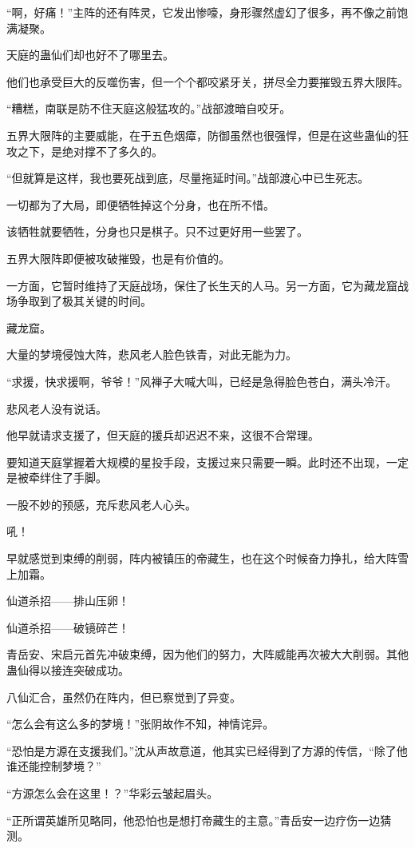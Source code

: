 \begin{this_body}
“啊，好痛！”主阵的还有阵灵，它发出惨嚎，身形骤然虚幻了很多，再不像之前饱满凝聚。

天庭的蛊仙们却也好不了哪里去。

他们也承受巨大的反噬伤害，但一个个都咬紧牙关，拼尽全力要摧毁五界大限阵。

“糟糕，南联是防不住天庭这般猛攻的。”战部渡暗自咬牙。

五界大限阵的主要威能，在于五色烟瘴，防御虽然也很强悍，但是在这些蛊仙的狂攻之下，是绝对撑不了多久的。

“但就算是这样，我也要死战到底，尽量拖延时间。”战部渡心中已生死志。

一切都为了大局，即便牺牲掉这个分身，也在所不惜。

该牺牲就要牺牲，分身也只是棋子。只不过更好用一些罢了。

五界大限阵即便被攻破摧毁，也是有价值的。

一方面，它暂时维持了天庭战场，保住了长生天的人马。另一方面，它为藏龙窟战场争取到了极其关键的时间。

藏龙窟。

大量的梦境侵蚀大阵，悲风老人脸色铁青，对此无能为力。

“求援，快求援啊，爷爷！”风禅子大喊大叫，已经是急得脸色苍白，满头冷汗。

悲风老人没有说话。

他早就请求支援了，但天庭的援兵却迟迟不来，这很不合常理。

要知道天庭掌握着大规模的星投手段，支援过来只需要一瞬。此时还不出现，一定是被牵绊住了手脚。

一股不妙的预感，充斥悲风老人心头。

吼！

早就感觉到束缚的削弱，阵内被镇压的帝藏生，也在这个时候奋力挣扎，给大阵雪上加霜。

仙道杀招——排山压卵！

仙道杀招——破镜碎芒！

青岳安、宋启元首先冲破束缚，因为他们的努力，大阵威能再次被大大削弱。其他蛊仙得以接连突破成功。

八仙汇合，虽然仍在阵内，但已察觉到了异变。

“怎么会有这么多的梦境！”张阴故作不知，神情诧异。

“恐怕是方源在支援我们。”沈从声故意道，他其实已经得到了方源的传信，“除了他谁还能控制梦境？”

“方源怎么会在这里！？”华彩云皱起眉头。

“正所谓英雄所见略同，他恐怕也是想打帝藏生的主意。”青岳安一边疗伤一边猜测。


\end{this_body}
